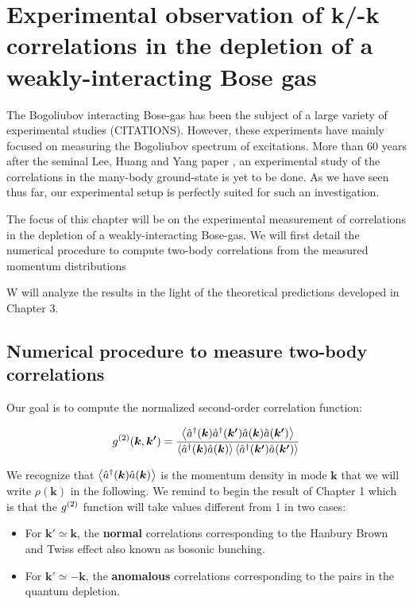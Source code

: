 \chapter{Experimental observation of k/-k correlations in the depletion of a weakly-interacting Bose gas}

The Bogoliubov interacting Bose-gas has been the subject of a large variety of experimental studies (CITATIONS). However, these experiments have mainly focused on measuring the Bogoliubov spectrum of excitations. More than 60 years after the seminal Lee, Huang and Yang paper \cite{lee1957}, an experimental study of the correlations in the many-body ground-state is yet to be done. As we have seen thus far, our experimental setup is perfectly suited for such an investigation. 

The focus of this chapter will be on the experimental measurement of \kmk correlations in the depletion of a weakly-interacting Bose-gas. We will first detail the numerical procedure to compute two-body correlations from the measured momentum distributions 

W will analyze the results in the light of the theoretical predictions developed in Chapter 3. 

\section{Numerical procedure to measure two-body correlations}

\label{sec:numerical_calculation}

Our goal is to compute the normalized second-order correlation function:

\begin{equation}
    g^{(2)} (\bm{k},\bm{k'}) = \frac{\left\langle\hat{a}^{\dagger}(\bm{k}) \hat{a}^{\dagger}(\bm{k'}) \hat{a}(\bm{k}) \hat{a}(\bm{k'})\right\rangle}{\left\langle\hat{a}^{\dagger}(\bm{k}) \hat{a}(\bm{k}) \right\rangle \left\langle\hat{a}^{\dagger}(\bm{k'}) \hat{a}(\bm{k'}) \right\rangle}
\end{equation}

\noindent We recognize that $\left\langle\hat{a}^{\dagger}(\bm{k}) \hat{a}(\bm{k})\right\rangle$ is the momentum density in mode $\bm{k}$ that we will write $\rho(\bm{k})$ in the following. We remind to begin the result of Chapter 1 which is that the $g^{(2)}$ function will take values different from 1 in two cases:

\begin{itemize}
    \item For $\bm{k'} \simeq \bm{k}$, the \textbf{normal} correlations corresponding to the Hanbury Brown and Twiss effect also known as bosonic bunching.
    \item For $\bm{k'} \simeq -\bm{k}$, the \textbf{anomalous} correlations corresponding to the \kmk pairs in the quantum depletion.
\end{itemize}

